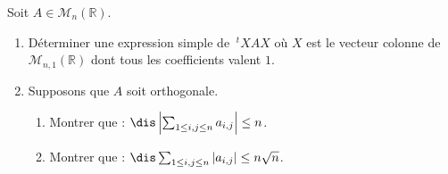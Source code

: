 \documentclass[a4paper,10pt]{report}
\begin{document}

\begin{Exa} Soit $A \in \mathcal{M}_n(\mathbb{R})$.

\begin{enumerate}
\item Déterminer une expression simple de $~^tX A X$ où $X$ est le vecteur colonne de $\mathcal{M}_{n,1}(\mathbb{R})$ dont tous les coefficients valent $1$.  
\item Supposons que $A$ soit orthogonale.
\begin{enumerate}
\item Montrer que : $\dis \left\vert \sum_{1 \leq i,j \leq n} a_{i,j} \right\vert \leq n$.
\item Montrer que : $\dis  \sum_{1 \leq i,j \leq n} \vert a_{i,j} \vert  \leq n \sqrt{n}$.
\end{enumerate}
\end{enumerate}
\end{Exa}
\end{document}
